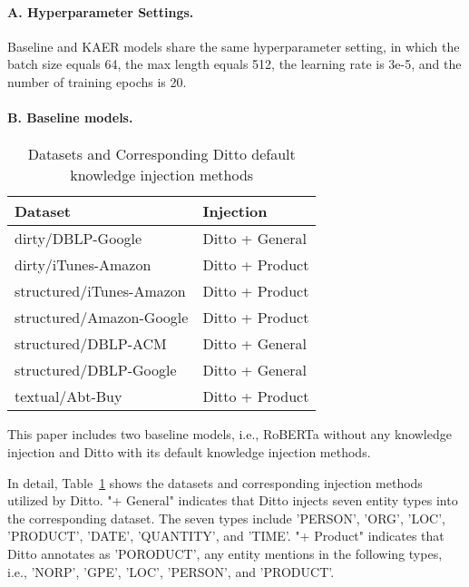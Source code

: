 \paragraph{A. Hyperparameter Settings.} 
Baseline and KAER models share the same hyperparameter setting, in which the batch size equals 64, the max length equals 512, the learning rate is 3e-5, and the number of training epochs is 20. 

\paragraph{B. Baseline models.} 
\begin{table}[!b]
\centering
\begin{tabular}{|l|l|}
\hline
Dataset                  & Injection       \\ \hline
dirty/DBLP-Google        & Ditto + General \\ \hline
dirty/iTunes-Amazon      & Ditto + Product \\ \hline
structured/iTunes-Amazon & Ditto + Product \\ \hline
structured/Amazon-Google & Ditto + Product \\ \hline
structured/DBLP-ACM      & Ditto + General \\ \hline
structured/DBLP-Google   & Ditto + General \\ \hline
textual/Abt-Buy          & Ditto + Product \\ \hline
\end{tabular}
\caption{Datasets and Corresponding Ditto default knowledge injection methods}
\label{tab:dittoinject}
\end{table}
This paper includes two baseline models, i.e., RoBERTa without any knowledge injection and Ditto with its default knowledge injection methods. 

In detail, Table~\ref{tab:dittoinject} shows the datasets and corresponding injection methods utilized by Ditto. "+ General" indicates that Ditto injects seven entity types into the corresponding dataset. The seven types include 'PERSON', 'ORG', 'LOC', 'PRODUCT', 'DATE', 'QUANTITY', and 'TIME'. "+ Product" indicates that Ditto annotates as 'PORODUCT', any entity mentions in the following types, i.e., 'NORP', 'GPE', 'LOC', 'PERSON', and 'PRODUCT'.

